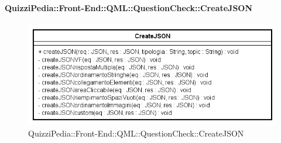 \paragraph[QuizziPedia::Front-End::QML:: \\ QuestionCheck::CreateJSON]{QuizziPedia::Front-End::QML::QuestionCheck::CreateJSON}
\begin{figure} [ht]
	\centering
	\includegraphics[scale=0.32]{UML/Classi/Front-End/QuizziPedia_Front-end_QML_QuestionCheck_CreateJSON.png}
	\caption{QuizziPedia::Front-End::QML::QuestionCheck::CreateJSON}
\end{figure} \FloatBarrier
